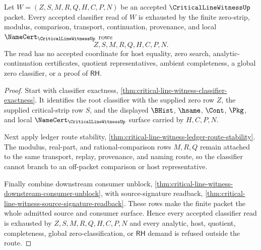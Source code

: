 \begin{theorem}
\label{thm:critical-line-witness-route-classifier-exhaustion}
Let $W=(Z,S,M,R,Q,H,C,P,N)$ be an accepted $\CriticalLineWitnessUp$ packet.
Every accepted classifier read of $W$ is exhausted by the finite zero-strip,
modulus, comparison, transport, continuation, provenance, and local
$\NameCert_{\CriticalLineWitnessUp}$ rows
$$
Z,S,M,R,Q,H,C,P,N .
$$
The read has no accepted coordinate for host equality, zero search,
analytic-continuation certificates, quotient representatives, ambient
completeness, a global zero classifier, or a proof of $\mathsf{RH}$.
\end{theorem}
\begin{proof}
Start with classifier exactness,
\autoref{thm:critical-line-witness-classifier-exactness}. It identifies the
root classifier with the supplied zero row $Z$, the supplied critical-strip
row $S$, and the displayed $\BHist$, $\hsame$, $\Cont$, $\Pkg$, and local
$\NameCert_{\CriticalLineWitnessUp}$ surface carried by $H,C,P,N$.

Next apply ledger route stability,
\autoref{thm:critical-line-witness-ledger-route-stability}. The modulus,
real-part, and rational-comparison rows $M,R,Q$ remain attached to the same
transport, replay, provenance, and naming route, so the classifier cannot
branch to an off-packet comparison or host representative.

Finally combine downstream consumer unblock,
\autoref{thm:critical-line-witness-downstream-consumer-unblock}, with
source-signature readback,
\autoref{thm:critical-line-witness-source-signature-readback}. These rows
make the finite packet the whole admitted source and consumer surface. Hence
every accepted classifier read is exhausted by
$Z,S,M,R,Q,H,C,P,N$ and every analytic, host, quotient, completeness, global
zero-classification, or $\mathsf{RH}$ demand is refused outside the route.
\end{proof}

